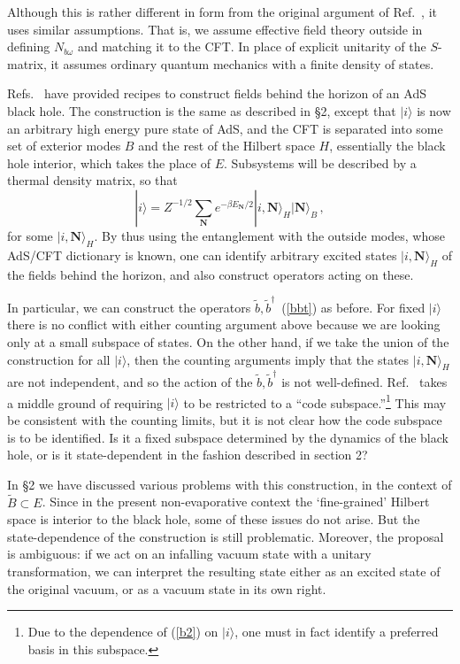 \documentclass[12pt]{article}
\newcommand{\be}{\begin{equation}}
\newcommand{\ee}{\end{equation}}
\begin{document}
{Although this is rather different in form from the original argument of Ref.~\cite{Almheiri:2012rt}, it uses similar assumptions.  That is, we assume effective field theory outside in defining $N_{b\omega}$ and matching it to the CFT.  In place of explicit unitarity of the $S$-matrix, it assumes ordinary quantum mechanics with a finite density of states.

Refs.~\cite{Papadodimas:2012aq,Verlinde:2012cy} have provided recipes to construct fields behind the horizon of an AdS black hole.  The construction is the same as described in \S2, except that $|i\rangle$ is now an arbitrary high energy pure state of AdS, and the CFT is separated into some set of exterior modes $B$ and the rest of the Hilbert space $H$, essentially the black hole interior, which takes the place of $E$. Subsystems will be described by a thermal density matrix, so that
\be
|i\rangle = Z^{-1/2} \sum_{\bm N} e^{-\beta E_{\bm N}/2} |i, {\bm N} \rangle_{H}  |{\bm N}\rangle_B \,,
\label{entangle}
\ee
for some $|i, {\bm N} \rangle_{H}$.  By thus using the entanglement with the outside modes, whose AdS/CFT dictionary is known, one can identify arbitrary excited states $|i, {\bm N} \rangle_H$ of the fields behind the horizon, and also construct operators acting on these.}

In particular, we can construct the operators $\tilde b, \tilde b^\dagger$~(\ref{bbt}) as before.  For fixed $|i \rangle$ there is no conflict with either counting argument above because we are looking only at a small subspace of states.  On the other hand, if we take the union of the construction for all $|i \rangle$, then the counting arguments imply that the states $|i, {\bm N} \rangle_{H}$ are not independent, and so the action of the $\tilde b, \tilde b^\dagger$ is not well-defined.  Ref.~\cite{Verlinde:2012cy} takes a middle ground of requiring $|i\rangle$ to be restricted to a ``code subspace.''\footnote{Due to the dependence of (\ref{b2}) on $|i\rangle$, one must in fact identify a preferred basis in this subspace.}  This may be consistent with the counting limits, but it is not clear how the code subspace is to be identified.  Is it a fixed subspace determined by the dynamics of the black hole, or is it state-dependent in the fashion described in section 2?


In \S2 we have discussed various problems with this construction, in the context of $\tilde B \subset E$.  {Since in the present non-evaporative context the `fine-grained' Hilbert space is interior to the black hole, some of these issues do not arise. But} the state-dependence of the construction is still problematic.  {Moreover, the proposal is ambiguous}: if we act on an infalling vacuum state with a unitary transformation, we can interpret the resulting state either as an excited state of the original vacuum, or as a vacuum state in its own right.
\end{document}
